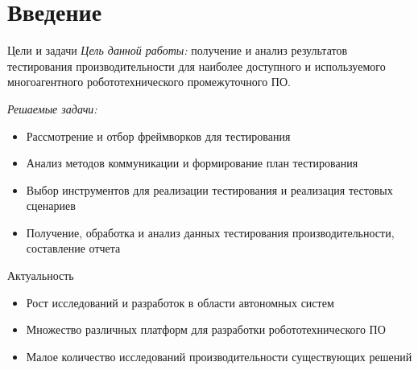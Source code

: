 \section{Введение}

\begin{frame}{Цели и задачи}
	\textit{Цель данной работы:} получение и анализ результатов тестирования производительности для наиболее доступного и используемого многоагентного робототехнического промежуточного ПО.
	
	\textit{Решаемые задачи:}
	\begin{itemize}
	 \item Рассмотрение и отбор фреймворков для тестирования
	 \item Анализ методов коммуникации и формирование план тестирования
	 \item Выбор инструментов для реализации тестирования и реализация тестовых сценариев
	 \item Получение, обработка и анализ данных тестирования производительности, составление отчета
	\end{itemize}
\end{frame}

\begin{frame}{Актуальность}
	\Large
	\begin{itemize}
		\item Рост исследований и разработок в области автономных систем
		\item Множество различных платформ для разработки робототехнического ПО
		\item Малое количество исследований производительности существующих решений
	\end{itemize}
\end{frame}
